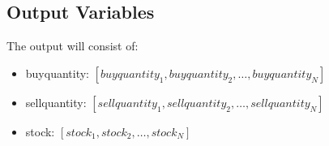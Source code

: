 \documentclass{article}
\begin{document}
\subsection*{Output Variables}
The output will consist of:
\begin{itemize}
    \item buyquantity: $[buyquantity_1, buyquantity_2, \ldots, buyquantity_N]$
    \item sellquantity: $[sellquantity_1, sellquantity_2, \ldots, sellquantity_N]$
    \item stock: $[stock_1, stock_2, \ldots, stock_N]$
\end{itemize}
\end{document}
